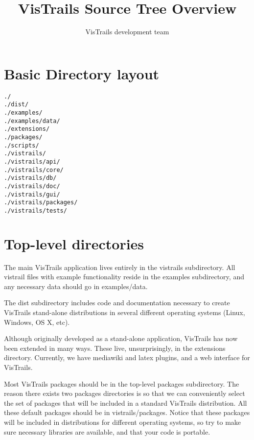 \documentclass{article}
\begin{document}
\title{VisTrails Source Tree Overview}

\author{VisTrails development team}

\maketitle


\section{Basic Directory layout}

\begin{verbatim}
./
./dist/
./examples/
./examples/data/
./extensions/
./packages/
./scripts/
./vistrails/
./vistrails/api/
./vistrails/core/
./vistrails/db/
./vistrails/doc/
./vistrails/gui/
./vistrails/packages/
./vistrails/tests/
\end{verbatim}

\section{Top-level directories}

The main VisTrails application lives entirely in the vistrails
subdirectory. All vistrail files with example functionality reside in
the examples subdirectory, and any necessary data should go in
examples/data. 

The dist subdirectory includes code and documentation necessary to
create VisTrails stand-alone distributions in several different
operating systems (Linux, Windows, OS X, etc).

Although originally developed as a stand-alone application, VisTrails
has now been extended in many ways. These live, unsurprisingly, in the
extensions directory. Currently, we have mediawiki and latex plugins,
and a web interface for VisTrails. 

Most VisTrails packages should be in the top-level packages
subdirectory. The reason there exists two packages directories is so
that we can conveniently select the set of packages that will be
included in a standard VisTrails distribution. All these default
packages should be in vistrails/packages. Notice that these packages
will be included in distributions for different operating systems, so
try to make sure necessary libraries are available, and that your code
is portable.
\end{document}
